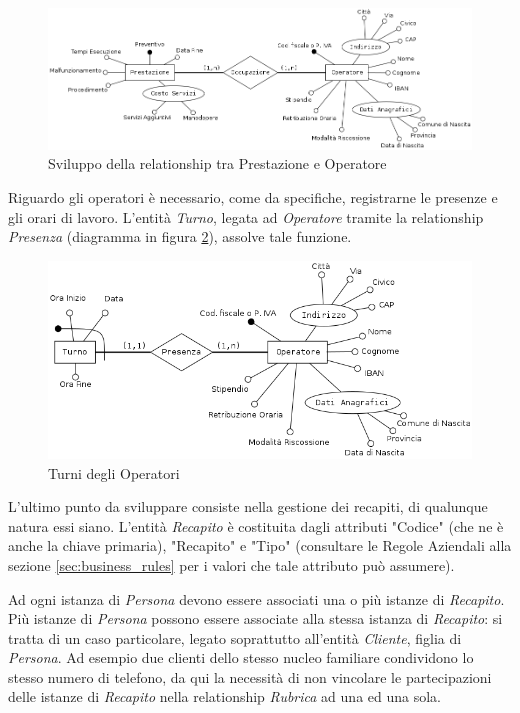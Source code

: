 			\begin{figure}
				\centering
				\includegraphics[width=11.5cm]{images/finitures/operatore_prestazione.png}
				\caption{Sviluppo della relationship tra Prestazione e Operatore}
				\label{fig:operatore_prestazione}
			\end{figure}
			
			Riguardo gli operatori è necessario, come da specifiche, registrarne le presenze e gli orari di lavoro. L'entità \emph{Turno}, legata ad \emph{Operatore} tramite la relationship \emph{Presenza} (diagramma in figura \ref{fig:operatore_turno}), assolve tale funzione.
			
			\begin{figure}
				\centering
				\includegraphics[width=11.5cm]{images/finitures/operatore_turno.png}
				\caption{Turni degli Operatori}
				\label{fig:operatore_turno}
			\end{figure}
			
			L'ultimo punto da sviluppare consiste nella gestione dei recapiti, di qualunque natura essi siano. L'entità \emph{Recapito} è costituita dagli attributi "Codice" (che ne è anche la chiave primaria), "Recapito" e "Tipo" (consultare le Regole Aziendali alla sezione \ref{sec:business_rules} per i valori che tale attributo può assumere).

			Ad ogni istanza di \emph{Persona} devono essere associati una o più istanze di \emph{Recapito}. 
			Più istanze di \emph{Persona} possono essere associate alla stessa istanza di \emph{Recapito}: si tratta di un caso particolare, legato soprattutto all'entità \emph{Cliente}, figlia di \emph{Persona}.
			Ad esempio due clienti dello stesso nucleo familiare condividono lo stesso numero di telefono, da qui la necessità di non vincolare le partecipazioni delle istanze di \emph{Recapito} nella relationship \emph{Rubrica} ad una ed una sola.
			
